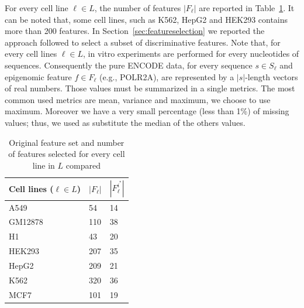 For every cell line $\ell \in L$, the number of features $| F_\ell |$ are reported in Table~\ref{tab:featuressize}. It can be noted that, some cell lines, such as K562, HepG2 and HEK293 contains more than 200 features. In Section~\ref{sec:featureselection} we reported the approach followed to select a subset of discriminative features.
Note that, for every cell lines $\ell \in L$, in vitro experiments are
performed for every nucleotides of sequences. Consequently the pure ENCODE
data, for every sequence $s \in S_\ell$ and epigenomic feature $f \in
F_\ell$ (e.g., POLR2A), are represented by a $|s|$-length vectors of real
numbers. Those values must be summarized in a single metrics. The most
common used metrics are mean, variance and maximum, we choose to use
maximum. Moreover we have a very small percentage (less than 1\%) of
missing values; thus, we used as substitute the median of the others
values.
\begin{table}[t]
\centering
\begin{tabular}{|l|l|l|}
\hline
\textbf{Cell lines ($\ell \in L$)} & \textbf{$|F_\ell|$} & \textbf{$|F_\ell^{i^{*}}|$} \\ \hline
A549               & 54 & 14                  \\ \hline
GM12878            & 110 & 38                 \\ \hline
H1                 & 43 & 20                  \\ \hline
HEK293             & 207 & 35                 \\ \hline
HepG2              & 209 & 21                 \\ \hline
K562               & 320 & 36                 \\ \hline
MCF7               & 101 & 19                 \\ \hline
\end{tabular}
\caption{Original feature set and number of features selected for every cell line in $L$ compared}
\label{tab:featuressize}
\end{table}
